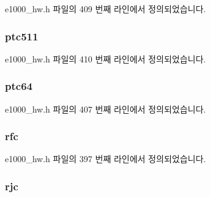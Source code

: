e1000\+\_\+hw.\+h 파일의 409 번째 라인에서 정의되었습니다.

\subsubsection[{\texorpdfstring{ptc511}{ptc511}}]{ ptc511}\hypertarget{structe1000__hw__stats_a85fb8ab661f8d5735ac24cb18fcce3cc}{}\label{structe1000__hw__stats_a85fb8ab661f8d5735ac24cb18fcce3cc}


e1000\+\_\+hw.\+h 파일의 410 번째 라인에서 정의되었습니다.

\subsubsection[{\texorpdfstring{ptc64}{ptc64}}]{ ptc64}\hypertarget{structe1000__hw__stats_a5d78ae3c3bb9104a1831c47335b1e238}{}\label{structe1000__hw__stats_a5d78ae3c3bb9104a1831c47335b1e238}


e1000\+\_\+hw.\+h 파일의 407 번째 라인에서 정의되었습니다.

\subsubsection[{\texorpdfstring{rfc}{rfc}}]{ rfc}\hypertarget{structe1000__hw__stats_a4c0e0425729b869de265cf14b7d698a2}{}\label{structe1000__hw__stats_a4c0e0425729b869de265cf14b7d698a2}


e1000\+\_\+hw.\+h 파일의 397 번째 라인에서 정의되었습니다.

\subsubsection[{\texorpdfstring{rjc}{rjc}}]{ rjc}\hypertarget{structe1000__hw__stats_ae9236f80b267ba3ea02c4770456646b0}{}\label{structe1000__hw__stats_ae9236f80b267ba3ea02c4770456646b0}


